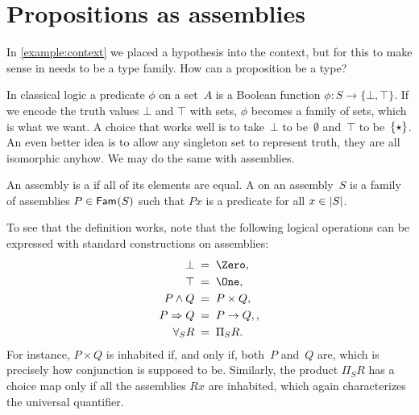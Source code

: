 \section{Propositions as assemblies}
\label{sec:prop-as-assemblies}

In \cref{example:context} we placed a hypothesis into the context, but for this to make sense in needs to be a type family. How can a proposition be a type?

In classical logic a predicate $\phi$ on a set~$A$ is a Boolean function $\phi : S \to \{\bot, \top\}$. If we encode the truth values $\bot$ and $\top$ with sets, $\phi$ becomes a family of sets, which is what we want. A choice that works well is to take~$\bot$ to be~$\emptyset$ and~$\top$ to be~$\set{\star}$. An even better idea is to allow any singleton set to represent truth, they are all isomorphic anyhow. We may do the same with assemblies.

\begin{definition}
  An assembly is a  if all of its elements are equal.
  A  on an assembly~$S$ is a family of assemblies $P \in \Fam{S}$ such that $P x$ is a predicate for all $x \in \S{S}$.
\end{definition}

To see that the definition works, note that the following logical operations can be expressed with standard constructions on assemblies:
%
\begin{equation}
  \label{eq:prop-as-type-negative}
  \begin{aligned}
    \bot &\;=\; \Zero, \\
    \top &\;=\; \One, \\
    P \land Q &\;=\; P \times Q, \\
    P \lthen Q &\;=\; P \to Q,, \\
    \forall_S R &\;=\; \Pi_S R.
  \end{aligned}
\end{equation}
%
For instance, $P \times Q$ is inhabited if, and only if, both~$P$ and~$Q$ are, which is precisely how conjunction is supposed to be.
%
Similarly, the product $\Pi_S R$ has a choice map only if all the assemblies $R x$ are inhabited, which again characterizes the universal quantifier.

